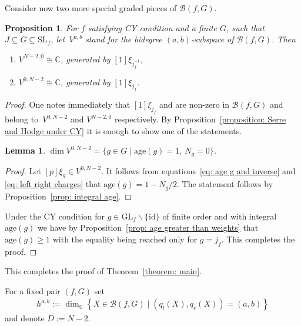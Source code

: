 \documentclass[10pt,a4paper]{article}
\numberwithin{equation}{section}
\newtheorem{Lemma}[Theorem]{Lemma}
\newtheorem{Proposition}[Theorem]{Proposition}
 { \theoremstyle{definition}
\newtheorem{Definition}[Theorem]{Definition}
\newtheorem{Note}[Theorem]{Note}
\newtheorem{Example}[Theorem]{Example}
\newtheorem{Remark}[Theorem]{Remark} }
\newcommand{\CC}{{\mathbb{C}}}
\newcommand{\SL}{{\mathrm{SL}}}
\newcommand{\GL}{{\mathrm{GL}}}
\newcommand{\id}{\mathrm{id}}
\newcommand{\age}{\mathrm{age}}
\def\B{{\mathcal B}}
\begin{document}
Consider now two more special graded pieces of $\B(f,G)$.

\begin{Proposition}\label{proposition: hd0}
	For $f$ satisfying CY condition and a finite $G$, such that $J \subseteq G \subseteq \SL_f$, let~$V^{a,b}$ stand for the bidegree $(a,b)$-subspace of $\B(f,G)$.
	Then
	\begin{enumerate}\itemsep=0pt
	 \item[$(1)$] $V^{N-2,0} \cong \CC$, generated by $[1]\xi_{j_f^{-1}}$,
	 \item[$(2)$] $V^{0,N-2} \cong \CC$, generated by $[1]\xi_{j_f}$.
	\end{enumerate}
\end{Proposition}
\begin{proof}
 One notes immediately that $[1]\xi_{j_f}$ and  are non-zero in $\B(f,G)$ and belong to~$V^{0,N-2}$ and $V^{N-2,0}$ respectively. By Proposition~\ref{proposition: Serre and Hodge under CY} it is enough to show one of the statements.

 \begin{Lemma}
 $\dim V^{0,N-2} = \lbrace g \in G \mid \age(g) = 1$, $ N_g = 0 \rbrace$.
 \end{Lemma}
 \begin{proof}
 Let $[p]\xi_g \in V^{0,N-2}$. It follows from equations~\eqref{eq: age g and inverse} and \eqref{eq: left right charges} that $\age(g) = 1 - N_g/2$. The statement follows by Proposition~\ref{prop: integral age}.
 \end{proof}

 Under the CY condition for $g \in \GL_f \backslash \lbrace \id \rbrace$ of finite order and with integral $\age(g)$ we have by Proposition~\ref{prop: age greater than weights} that $\age(g) \ge 1$ with the equality being reached only for $g = j_f$. This completes the proof.
\end{proof}
This completes the proof of Theorem~\ref{theorem: main}.

For a fixed pair $(f,G)$ set{\samepage
\begin{align*}
	h^{a,b} := \dim_\CC \left\lbrace X \in \B(f,G) \mid (q_l(X),q_r(X)) = (a,b)\right\rbrace
\end{align*}
and denote $D := N-2$.}
\end{document}
